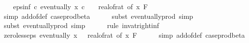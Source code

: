 \begin{isabellebody}
\isanewline
\ \ \isamarkupfalse%
\ eps{\isacharunderscore}{\kern0pt}inf{\isacharcolon}{\kern0pt}\ {\isachardoublequoteopen}{\isasymAnd}c{\isachardot}{\kern0pt}\ eventually\ {\isacharparenleft}{\kern0pt}{\isasymlambda}x{\isachardot}{\kern0pt}\ c\ {\isasymle}\ {}\ {\isacharslash}{\kern0pt}\ {\isacharparenleft}{\kern0pt}real{\isacharunderscore}{\kern0pt}of{\isacharunderscore}{\kern0pt}rat\ {\isacharparenleft}{\kern0pt}{\isasymepsilon}{\isacharunderscore}{\kern0pt}of\ x{\isacharparenright}{\kern0pt}{\isacharparenright}{\kern0pt}{\isacharparenright}{\kern0pt}\ {\isacharquery}{\kern0pt}F{\isachardoublequoteclose}\isanewline
\ \ \ \ \isamarkupfalse%
\ {\isacharparenleft}{\kern0pt}simp\ add{\isacharcolon}{\kern0pt}{\isasymepsilon}{\isacharunderscore}{\kern0pt}of{\isacharunderscore}{\kern0pt}def\ case{\isacharunderscore}{\kern0pt}prod{\isacharunderscore}{\kern0pt}beta{\isacharprime}{\kern0pt}{\isacharparenright}{\kern0pt}\isanewline
\ \ \ \ \isamarkupfalse%
\ {\isacharparenleft}{\kern0pt}subst\ eventually{\isacharunderscore}{\kern0pt}prod{}{\isacharprime}{\kern0pt}{\isacharcomma}{\kern0pt}\ simp{\isacharparenright}{\kern0pt}\isanewline
\ \ \ \ \isamarkupfalse%
\ {\isacharparenleft}{\kern0pt}subst\ eventually{\isacharunderscore}{\kern0pt}prod{}{\isacharprime}{\kern0pt}{\isacharcomma}{\kern0pt}\ simp{\isacharparenright}{\kern0pt}\isanewline
\ \ \ \ \isamarkupfalse%
\ {\isacharparenleft}{\kern0pt}rule\ inv{\isacharunderscore}{\kern0pt}at{\isacharunderscore}{\kern0pt}right{\isacharunderscore}{\kern0pt}{}{\isacharunderscore}{\kern0pt}inf{\isacharparenright}{\kern0pt}\isanewline
\isanewline
\ \ \isamarkupfalse%
\ zero{\isacharunderscore}{\kern0pt}less{\isacharunderscore}{\kern0pt}eps{\isacharcolon}{\kern0pt}\ {\isachardoublequoteopen}eventually\ {\isacharparenleft}{\kern0pt}{\isasymlambda}x{\isachardot}{\kern0pt}\ {}\ {\isacharless}{\kern0pt}\ {\isacharparenleft}{\kern0pt}real{\isacharunderscore}{\kern0pt}of{\isacharunderscore}{\kern0pt}rat\ {\isacharparenleft}{\kern0pt}{\isasymepsilon}{\isacharunderscore}{\kern0pt}of\ x{\isacharparenright}{\kern0pt}{\isacharparenright}{\kern0pt}{\isacharparenright}{\kern0pt}\ {\isacharquery}{\kern0pt}F{\isachardoublequoteclose}\isanewline
\ \ \ \ \isamarkupfalse%
\ {\isacharparenleft}{\kern0pt}simp\ add{\isacharcolon}{\kern0pt}{\isasymepsilon}{\isacharunderscore}{\kern0pt}of{\isacharunderscore}{\kern0pt}def\ case{\isacharunderscore}{\kern0pt}prod{\isacharunderscore}{\kern0pt}beta{\isacharprime}{\kern0pt}{\isacharparenright}{\kern0pt}\isanewline

\end{isabellebody}

